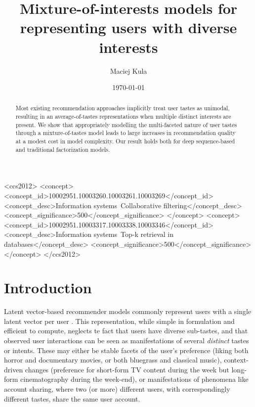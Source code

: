 \documentclass[sigchi]{acmart}
\begin{document}
\title{Mixture-of-interests models for representing users with diverse interests}
\author{Maciej Kula}
\date{\today}
\acmConference[]{}{}{}

\begin{CCSXML}
<ccs2012>
<concept>
<concept_id>10002951.10003260.10003261.10003269</concept_id>
<concept_desc>Information systems~Collaborative filtering</concept_desc>
<concept_significance>500</concept_significance>
</concept>
<concept>
<concept_id>10002951.10003317.10003338.10003346</concept_id>
<concept_desc>Information systems~Top-k retrieval in databases</concept_desc>
<concept_significance>500</concept_significance>
</concept>
</ccs2012>
\end{CCSXML}




\begin{abstract}
Most existing recommendation approaches implicitly treat user tastes as unimodal, resulting in an average-of-tastes representations when multiple distinct interests are present. We show that appropriately modelling the multi-faceted nature of user tastes through a mixture-of-tastes model leads to large increases in recommendation quality at a modest cost in model complexity. Our result holds both for deep sequence-based and traditional factorization models. 
\end{abstract}

\maketitle


\section{Introduction}
Latent vector-based recommender models commonly represent users with a single latent vector per user \citep{koren2009bellkor, hu2008collaborative}. This representation, while simple in formulation and efficient to compute, neglects te fact that users have diverse sub-tastes, and that observed user interactions can be seen as manifestations of several \emph{distinct} tastes or intents. These may either be stable facets of the user's preference (liking both horror and documentary movies, or both bluegrass and classical music), context-driven changes (preference for short-form TV content during the week but long-form cinematography during the week-end), or manifestations of phenomena like account sharing, where two (or more) different users, with correspondingly different tastes, share the same user account.
\end{document}

